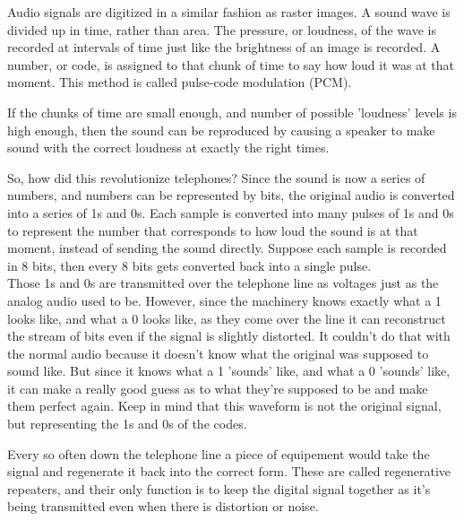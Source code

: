 Audio signals are digitized in a similar fashion as raster images. A sound wave is divided up in time, rather than area. The pressure, or loudness, of the wave is recorded at intervals of time just like the brightness of an image is recorded. A number, or code, is assigned to that chunk of time to say how loud it was at that moment. This method is called pulse-code modulation (PCM).

If the chunks of time are small enough, and number of possible 'loudness' levels is high enough, then the sound can be reproduced by causing a speaker to make sound with the correct loudness at exactly the right times.\\

\begin{center}\end{center}
\begin{center}\end{center}

So, how did this revolutionize telephones? Since the sound is now a series of numbers, and numbers can be represented by bits, the original audio is converted into a series of 1s and 0s. Each sample is converted into many pulses of 1s and 0s to represent the number that corresponds to how loud the sound is at that moment, instead of sending the sound directly. Suppose each sample is recorded in 8 bits, then every 8 bits gets converted back into a single pulse.\\

Those 1s and 0s are transmitted over the telephone line as voltages just as the analog audio used to be. However, since the machinery knows exactly what a 1 looks like, and what a 0 looks like, as they come over the line it can reconstruct the stream of bits even if the signal is slightly distorted. It couldn't do that with the normal audio because it doesn't know what the original was supposed to sound like. But since it knows what a 1 'sounds' like, and what a 0 'sounds' like, it can make a really good guess as to what they're supposed to be and make them perfect again. Keep in mind that this waveform is not the original signal, but representing the 1s and 0s of the codes.\\

\begin{center}\end{center}

Every so often down the telephone line a piece of equipement would take the signal and regenerate it back into the correct form. These are called regenerative repeaters, and their only function is to keep the digital signal together as it's being transmitted even when there is distortion or noise.\\

